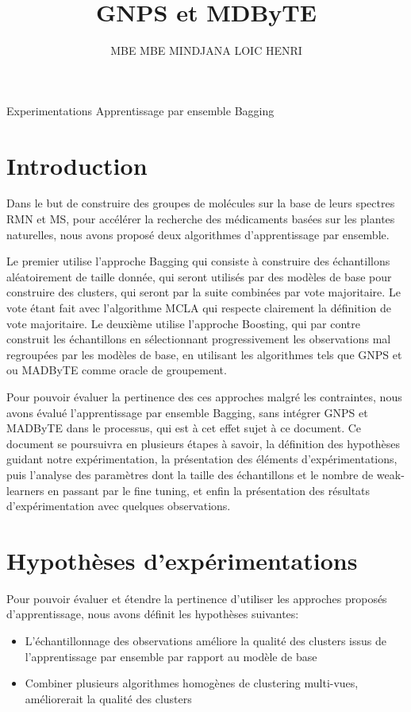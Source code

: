 \documentclass[12pt,a4paper]{report}
\author{MBE MBE MINDJANA LOIC HENRI}
\title{GNPS et MDByTE}
\begin{document}
    
	\pagecouverture
	{Experimentations}
	{Apprentissage par ensemble Bagging}
	\tableofcontents
	\vspace{20cm}
    
	\section{Introduction}
	Dans le but de construire des groupes de molécules sur la base de leurs spectres RMN et MS, pour accélérer la recherche des médicaments basées sur les plantes naturelles, nous avons proposé deux algorithmes d'apprentissage par ensemble.

	Le premier utilise l'approche Bagging qui consiste à construire des échantillons aléatoirement de taille donnée, qui seront utilisés par des modèles de base pour construire des clusters, qui seront par la suite combinées par vote majoritaire. Le vote étant fait avec l'algorithme MCLA qui respecte clairement la définition de vote majoritaire.
	Le deuxième utilise l'approche Boosting, qui par contre construit les échantillons en sélectionnant progressivement les observations mal regroupées par les modèles de base, en utilisant les algorithmes tels que GNPS et ou MADByTE comme oracle de groupement.
    
	Pour pouvoir évaluer la pertinence des ces approches malgré les contraintes, nous avons évalué l'apprentissage par ensemble Bagging, sans intégrer GNPS et MADByTE dans le processus, qui est à cet effet sujet à ce document.
	Ce document se poursuivra en plusieurs étapes à savoir, la définition des hypothèses guidant notre expérimentation, la présentation des éléments d'expérimentations, puis l'analyse des paramètres dont la taille des échantillons et le nombre de weak-learners en passant par le fine tuning, et enfin la présentation des résultats d'expérimentation avec quelques observations.
    
	\section{Hypothèses d'expérimentations}
	Pour pouvoir évaluer et étendre la pertinence d'utiliser les approches proposés d'apprentissage, nous avons définit les hypothèses suivantes:
    
	\begin{itemize}
    	\item L'échantillonnage des observations améliore la qualité des clusters issus de l'apprentissage par ensemble par rapport au modèle de base
    	\item Combiner plusieurs algorithmes homogènes de clustering multi-vues, améliorerait la qualité des clusters
	\end{itemize}
    
\end{document}
